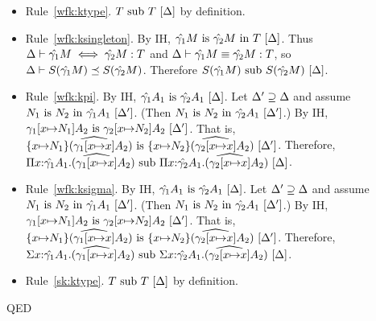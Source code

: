 \documentclass{article}
\theoremstyle{break}
\newcommand{\qed}{\mbox{QED}}
\newcommand{\env}{\gamma}
\newcommand{\envone}{\hat{\env_1}}
\newcommand{\envtwo}{\hat{\env_2}}
\newcommand{\envonex}{\widehat{\env_1[\cvar{\mapsto}\cvar]}}
\newcommand{\envtwox}{\widehat{\env_2[\cvar{\mapsto}\cvar]}}
\newenvironment{proof}{\noindent{\bf Proof:}\hspace*{0.5em}}{\hspace*{\fill}\qed}
\begin{document}
\begin{proof}
\begin{itemize}
\item Rule~\ref{wfk:ktype}.  
${T}\mathrm{\ sub\ }{T}\ [\Delta]$ by definition.

\item Rule~\ref{wfk:ksingleton}.  By IH, 
$\semanticequivterm{\world}{\envone\constructor}{\envtwo\constructor}{\ktype}$.  Thus
$\aconequiv{\world}{\envone\constructor}{\envtwo\constructor}{\ktype}$ and
$\equivconstructor{\world}{\envone\constructor}{\envtwo\constructor}{\ktype}$, so
$\subkind{\world}{\ksingleton{\envone\constructor}}{\ksingleton{\envtwo\constructor}}$.
Therefore $\semanticsubtype{\world}{\ksingleton{\envone\constructor}}{\ksingleton{\envtwo\constructor}}$.

\item Rule~\ref{wfk:kpi}.  
By IH, 
$\semanticequivtype{\world}{\envone\kind_1}{\envtwo\kind_1}$.
Let $\Delta'\supseteq\Delta$ and assume
$\semanticequivterm{\world'}{\otherconstructor_1}{\otherconstructor_2}{\envone\kind_1}$.
(Then $\semanticequivterm{\world'}{\otherconstructor_1}{\otherconstructor_2}{\envtwo\kind_1}$.)
By IH, 
$\semanticequivtype{\world'}{\env_1[\cvar{\mapsto}\otherconstructor_1]\kind_2}
{\env_2[\cvar{\mapsto}\otherconstructor_2]\kind_2}$. %
That is,
$\semanticequivtype{\world'}{\substitute{\cvar}{\otherconstructor_1}(\envonex\kind_2)}
   {\substitute{\cvar}{\otherconstructor_2}(\envtwox\kind_2)}$. %
Therefore, 
$\semanticsubtype{\world}{\kpi{\cvar}{\envone\kind_1}{(\envonex\kind_2})}
   {\kpi{\cvar}{\envtwo\kind_1}{(\envtwox\kind_2)}}$. %

\item Rule~\ref{wfk:ksigma}.
By IH, 
$\semanticequivtype{\world}{\envone\kind_1}{\envtwo\kind_1}$.
Let $\Delta'\supseteq\Delta$ and assume
$\semanticequivterm{\world'}{\otherconstructor_1}{\otherconstructor_2}{\envone\kind_1}$.
(Then $\semanticequivterm{\world'}{\otherconstructor_1}{\otherconstructor_2}{\envtwo\kind_1}$.)
By IH, 
$\semanticequivtype{\world'}{\env_1[\cvar{\mapsto}\otherconstructor_1]\kind_2}
{\env_2[\cvar{\mapsto}\otherconstructor_2]\kind_2}$. %
That is,
$\semanticequivtype{\world'}{\substitute{\cvar}{\otherconstructor_1}(\envonex\kind_2)}
   {\substitute{\cvar}{\otherconstructor_2}(\envtwox\kind_2)}$. %
Therefore, 
$\semanticsubtype{\world}{\ksigma{\cvar}{\envone\kind_1}{(\envonex\kind_2})}
   {\ksigma{\cvar}{\envtwo\kind_1}{(\envtwox\kind_2)}}$. %

\item Rule~\ref{sk:ktype}.
${T}\mathrm{\ sub\ }{T}\ [\Delta]$ by definition.


\end{itemize}
\end{proof}
\end{document}

